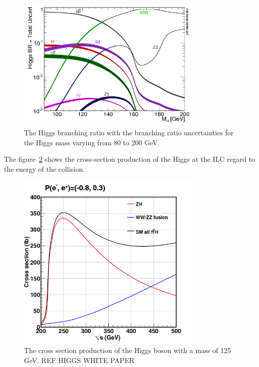   \begin{figure}[h]
    \centering
    \includegraphics[width = 0.8\textwidth]{Pictures/Higgs/BRTotalUncertBands_lm.png}
    \caption{The Higgs branching ratio with the branching ratio uncertainties for the Higgs mass varying from 80 to 200 GeV\cite{Denner:2011mq}.}
    \label{fig:higgsProd}
  \end{figure}

  The figure~\ref{fig:higgsXsec} shows the cross-section production of the Higgs at the ILC regard to the energy of the collision.
  
  \begin{figure}
    \centering
    \includegraphics[width = 0.8\textwidth]{Pictures/Higgs/higgs_xsec_P-8_3.png}
    \caption{The cross section production of the Higgs boson with a mass of 125 GeV. REF HIGGS WHITE PAPER}
    \label{fig:higgsXsec}
  \end{figure}

